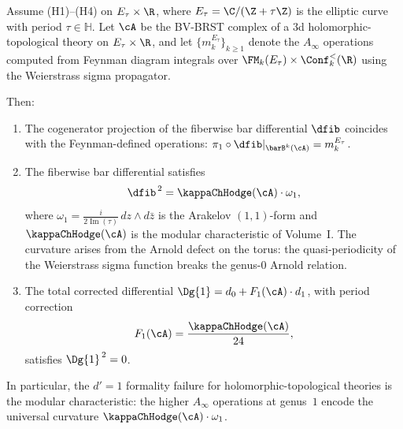 \begin{theorem}[Feynman curvature = modular characteristic at genus~$1$;
\ClaimStatusProvedHere]
Assume \textrm{(H1)--(H4)} on $E_\tau \times \R$, where
$E_\tau = \C/(\Z + \tau\Z)$ is the elliptic curve with period
$\tau \in \mathbb{H}$. Let $\cA$ be the BV-BRST complex of a 3d
holomorphic-topological theory on $E_\tau \times \R$, and let
$\{m_k^{E_\tau}\}_{k \geq 1}$ denote the $A_\infty$ operations
computed from Feynman diagram integrals over
$\FM_k(E_\tau) \times \Conf_k^{<}(\R)$ using the Weierstrass
sigma propagator.

Then:
\begin{enumerate}[label=\textup{(\roman*)}]
\item The cogenerator projection of the fiberwise bar differential
 $\dfib$ coincides with the Feynman-defined operations:
 $\pi_1 \circ \dfib|_{\barB^k(\cA)} = m_k^{E_\tau}$.
\item The fiberwise bar differential satisfies
 \begin{equation}
 \dfib^{\,2} = \kappaChHodge(\cA) \cdot \omega_1,
 \end{equation}
 where $\omega_1 = \frac{i}{2\operatorname{Im}(\tau)}\,dz \wedge
 d\bar{z}$ is the Arakelov $(1,1)$-form and $\kappaChHodge(\cA)$ is the
 modular characteristic of Volume~I. The curvature arises from
 the Arnold defect on the torus: the quasi-periodicity of the
 Weierstrass sigma function breaks the genus-$0$ Arnold relation.
\item The total corrected differential
 $\Dg{1} = d_0 + F_1(\cA) \cdot d_1$, with period correction
 \[
 F_1(\cA) = \frac{\kappaChHodge(\cA)}{24},
 \]
 satisfies $\Dg{1}^{\,2} = 0$.
\end{enumerate}
In particular, the $d' = 1$ formality failure for holomorphic-topological
theories is the modular
characteristic: the higher $A_\infty$ operations at genus~$1$ encode
the universal curvature $\kappaChHodge(\cA) \cdot \omega_1$.
\end{theorem}

